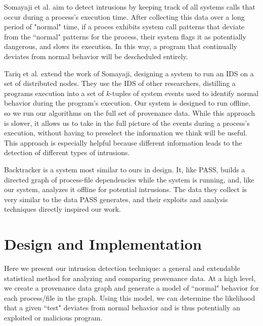\documentclass[10pt,twocolumn]{article}
\begin{document}
Somayaji et al. \cite{somayaji} aim to detect intrusions by keeping track of all systems calls that occur during a process's execution time. After collecting this data over a long period of "normal" time, if a proces exhibits system call patterns that deviate from the ``normal" patterns for the process, their system flags it as potentially dangerous, and slows its execution. In this way, a program that continually deviates from normal behavior will be descheduled entirely. 

Tariq et al. \cite{correlated-anomalies} extend the work of Somayaji, designing a system to run an IDS on a set of distributed nodes. They use the IDS of other researchers, distilling a programs execution into a set of $k$-tuples of system events used to identify normal behavior during the program's execution. Our system is designed to run offline, so we run our algorithms on the full set of provenance data. While this approach is slower, it allows us to take in the full picture of the events during a process's execution, without having to preselect the information we think will be useful. This approach is especially helpful because different information leads to the detection of different types of intrusions.

Backtracker \cite{backtracker} is a system most similar to ours in design. It, like PASS, builds a directed graph of process-file dependencies while the system is running, and, like our system, analyzes it offline for potential intrusions. The data they collect is very similar to the data PASS generates, and their exploits and analysis techniques directly inspired our work. 


%

\section{Design and Implementation}
Here we present our intrusion detection technique: a general and extendable statistical method for analyzing and comparing provenance data. At a high level, we create a provenance data graph and generate a model of ``normal" behavior for each process/file in the graph. Using this model, we can determine the likelihood that a given ``test" deviates from normal behavior and is thus potentially an exploited or malicious program.
\end{document}
